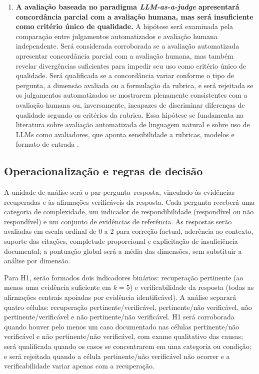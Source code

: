 \begin{enumerate}[label=\textbf{H\arabic*.}]
  \item \textbf{A avaliação baseada no paradigma \textit{LLM-as-a-judge} apresentará concordância parcial com a avaliação humana, mas será insuficiente como critério único de qualidade.} A hipótese será examinada pela comparação entre julgamentos automatizados e avaliação humana independente. Será considerada corroborada se a avaliação automatizada apresentar concordância parcial com a avaliação humana, mas também revelar divergências suficientes para impedir seu uso como critério único de qualidade. Será qualificada se a concordância variar conforme o tipo de pergunta, a dimensão avaliada ou a formulação da rubrica, e será rejeitada se os julgamentos automatizados se mostrarem plenamente consistentes com a avaliação humana ou, inversamente, incapazes de discriminar diferenças de qualidade segundo os critérios da rubrica. Essa hipótese se fundamenta na literatura sobre avaliação automatizada de linguagem natural e sobre uso de LLMs como avaliadores, que aponta sensibilidade a rubricas, modelos e formato de entrada \parencite{liuEtAl2023geval,liuEtAl2025judgeRag}.

\end{enumerate}

\subsection{Operacionalização e regras de decisão}

A unidade de análise será o par pergunta--resposta, vinculado às evidências recuperadas e às afirmações verificáveis da resposta. Cada pergunta receberá uma categoria de complexidade, um indicador de respondibilidade (respondível ou não respondível) e um conjunto de evidências de referência. As respostas serão avaliadas em escala ordinal de 0 a 2 para correção factual, aderência ao contexto, suporte das citações, completude proporcional e explicitação de insuficiência documental; a pontuação global será a média das dimensões, sem substituir a análise por dimensão.

Para H1, serão formados dois indicadores binários: recuperação pertinente (ao menos uma evidência suficiente em $k=5$) e verificabilidade da resposta (todas as afirmações centrais apoiadas por evidência identificável). A análise separará quatro células: recuperação pertinente/verificável, pertinente/não verificável, não pertinente/verificável e não pertinente/não verificável. H1 será corroborada quando houver pelo menos um caso documentado nas células pertinente/não verificável e não pertinente/não verificável, com exame qualitativo das causas; será qualificada quando os casos se concentrarem em uma categoria ou condição; e será rejeitada quando a célula pertinente/não verificável não ocorrer e a verificabilidade variar apenas com a recuperação.

